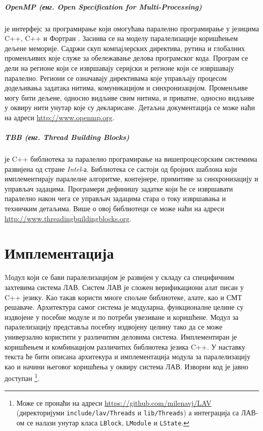 \documentclass[12pt,oneside]{memoir}
\begin{document}
\paragraph{OpenMP (енг. Open Specification for Multi-Processing)} је интерфејс за програмирање који омогућава паралелно програмирање у језицима C++, C++ и Фортран . Заснива се на моделу паралелизације коришћењем дељене меморије. Садржи скуп компајлерских директива, рутина и глобалних променљивих које служе за обележавање делова програмског кода. Програм се дели на регионе који се извршавају серијски и регионе који се извршавају паралелно. Региони се означавају директивама које управљају процесом додељивања задатака нитима, комуникацијом и синхронизацијом. Променљиве могу бити дељене, односно видљиве свим нитима, и приватне, односно видљиве у оквиру нити унутар које су декларисане. Детаљна документација се може наћи на адреси \url{http://www.openmp.org}. 

\paragraph{TBB (енг. Thread Building Blocks)} је C++ библиотека за паралелно програмирање на вишепроцесорским системима развијена од стране \emph{Intel}-а. Библиотека се састоји од бројних шаблона који имплементирају паралелне алгоритме, контејнере, примитиве за синхронизацију и управљач задацима. Програмери дефинишу задатке који ће се извршавати паралелно након чега се управљач задацима стара о току извршавања и техничким детаљима. Више о овој библиотеци се може наћи на адреси \url{http://www.threadingbuildingblocks.org}.


  
\chapter{Имплементација}

Mодул који се бави паралелизацијом је развијен у складу са специфичним захтевима система ЛАВ. Систем ЛАВ је сложен верификациони алат писан у C++ језику. Као такав користи многе спољне библиотеке, алате, као и СМТ решаваче.  Архитектура самог система је модуларна, функционалне целине су издвојене у посебне модуле и по потреби увезиване и коришћене. Модул за паралелизацију представља посебну издвојену целину тако да се може универзално користити у различитим деловима система. Имплементиран је коришћењем  и комбинацијом различитих библиотека језика C++.   У наставку текста ће бити описана архитекура и имплементација модула за паралелизацију као и начини његовог коришћења у оквиру система ЛАВ. Изворни код је јавно доступан \footnote{Може се пронаћи на адреси \url{https://github.com/milenavj/LAV} (директоријуми \texttt{include/lav/Threads} и \texttt{lib/Threads}) а интеграција са ЛАВ-ом се налази унутар класа \texttt{LBlock}, \texttt{LModule} и \texttt{LState}.}.  
\end{document}
